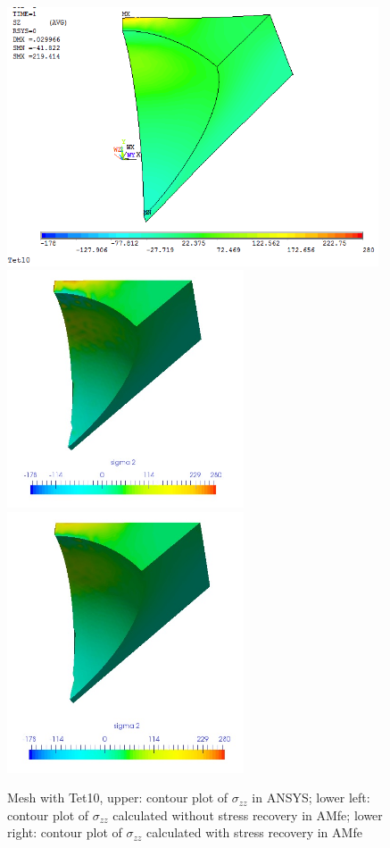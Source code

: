 \begin{figure}[htbp]
	\begin{center}
		\includegraphics[width=11cm,clip]{Tet10_Szz.png} 
		\includegraphics[width=7cm,clip]{Tet10_Szz_PD.png} 		
		\includegraphics[width=7cm,clip]{Tet10_Szz_P.png} 		
		\caption{Mesh with Tet10, upper: contour plot of $\sigma_{zz}$ in ANSYS; lower left: contour plot of $\sigma_{zz}$ calculated without stress recovery in AMfe; lower right: contour plot of $\sigma_{zz}$ calculated with stress recovery in AMfe} \label{fig: Tet10_Szz}
	\end{center}
\end{figure}
\clearpage 

